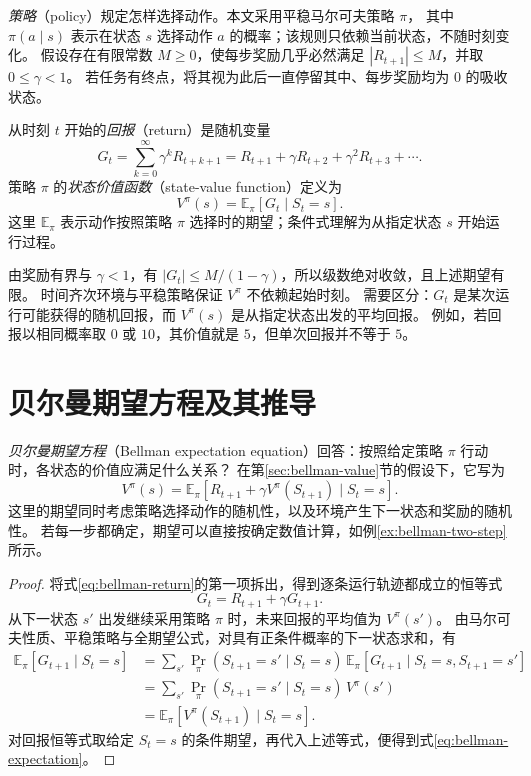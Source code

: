\documentclass[UTF8,12pt,a4paper,fontset=fandol]{ctexart}
\begin{document}
\emph{策略}（policy）规定怎样选择动作。本文采用平稳马尔可夫策略 $\pi$，
其中 $\pi(a\mid s)$ 表示在状态 $s$ 选择动作 $a$ 的概率；该规则只依赖当前状态，不随时刻变化。
假设存在有限常数 $M\geq0$，使每步奖励几乎必然满足 $|R_{t+1}|\leq M$，并取 $0\leq\gamma<1$。
若任务有终点，将其视为此后一直停留其中、每步奖励均为 $0$ 的吸收状态。

\begin{definition}[回报与状态价值函数]
从时刻 $t$ 开始的\emph{回报}（return）是随机变量
\begin{equation}
  G_t=\sum_{k=0}^{\infty}\gamma^k R_{t+k+1}
  =R_{t+1}+\gamma R_{t+2}+\gamma^2R_{t+3}+\cdots.
  \label{eq:bellman-return}
\end{equation}
策略 $\pi$ 的\emph{状态价值函数}（state-value function）定义为
\begin{equation}
  V^\pi(s)=\mathbb E_\pi[G_t\mid S_t=s].
  \label{eq:bellman-value}
\end{equation}
这里 $\mathbb E_\pi$ 表示动作按照策略 $\pi$ 选择时的期望；条件式理解为从指定状态 $s$ 开始运行过程。
\end{definition}

由奖励有界与 $\gamma<1$，有 $|G_t|\leq M/(1-\gamma)$，所以级数绝对收敛，且上述期望有限。
时间齐次环境与平稳策略保证 $V^\pi$ 不依赖起始时刻。
需要区分：$G_t$ 是某次运行可能获得的随机回报，而 $V^\pi(s)$ 是从指定状态出发的平均回报。
例如，若回报以相同概率取 $0$ 或 $10$，其价值就是 $5$，但单次回报并不等于 $5$。

\section{贝尔曼期望方程及其推导}
\label{sec:bellman-expectation}

\emph{贝尔曼期望方程}（Bellman expectation equation）回答：按照给定策略 $\pi$ 行动时，各状态的价值应满足什么关系？
在第\ref{sec:bellman-value}节的假设下，它写为
\begin{equation}
  \boxed{
  V^\pi(s)=\mathbb E_\pi\!\left[
    R_{t+1}+\gamma V^\pi(S_{t+1})\mid S_t=s
  \right].}
  \label{eq:bellman-expectation}
\end{equation}
这里的期望同时考虑策略选择动作的随机性，以及环境产生下一状态和奖励的随机性。
若每一步都确定，期望可以直接按确定数值计算，如例\ref{ex:bellman-two-step}所示。

\begin{proof}
将式\eqref{eq:bellman-return}的第一项拆出，得到逐条运行轨迹都成立的恒等式
\[
  G_t=R_{t+1}+\gamma G_{t+1}.
\]
从下一状态 $s'$ 出发继续采用策略 $\pi$ 时，未来回报的平均值为 $V^\pi(s')$。
由马尔可夫性质、平稳策略与全期望公式，对具有正条件概率的下一状态求和，有
\[
\begin{aligned}
  \mathbb E_\pi[G_{t+1}\mid S_t=s]
  &=\sum_{s'}\Pr_\pi(S_{t+1}=s'\mid S_t=s)\,
    \mathbb E_\pi[G_{t+1}\mid S_t=s,S_{t+1}=s']\\
  &=\sum_{s'}\Pr_\pi(S_{t+1}=s'\mid S_t=s)\,V^\pi(s')\\
  &=\mathbb E_\pi[V^\pi(S_{t+1})\mid S_t=s].
\end{aligned}
\]
对回报恒等式取给定 $S_t=s$ 的条件期望，再代入上述等式，便得到式\eqref{eq:bellman-expectation}。
\end{proof}
\end{document}
